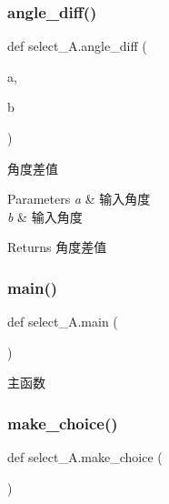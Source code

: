 \subsubsection{\texorpdfstring{angle\+\_\+diff()}{angle\_diff()}}
{\footnotesize\ttfamily def select\+\_\+\+A.\+angle\+\_\+diff (\begin{DoxyParamCaption}\item[{}]{a,  }\item[{}]{b }\end{DoxyParamCaption})}



角度差值 


\begin{DoxyParams}{Parameters}
{\em a} & 输入角度 \\
\hline
{\em b} & 输入角度\\
\hline
\end{DoxyParams}
\begin{DoxyReturn}{Returns}
角度差值 
\end{DoxyReturn}
\mbox{\label{namespaceselect___a_a6a3edd4d647a13591de5722d5232d1bb}} 
\subsubsection{\texorpdfstring{main()}{main()}}
{\footnotesize\ttfamily def select\+\_\+\+A.\+main (\begin{DoxyParamCaption}{ }\end{DoxyParamCaption})}



主函数 

\mbox{\label{namespaceselect___a_a39d0d3e4508cfd900be3ec4ec2331ec2}} 
\subsubsection{\texorpdfstring{make\+\_\+choice()}{make\_choice()}}
{\footnotesize\ttfamily def select\+\_\+\+A.\+make\+\_\+choice (\begin{DoxyParamCaption}{ }\end{DoxyParamCaption})}



